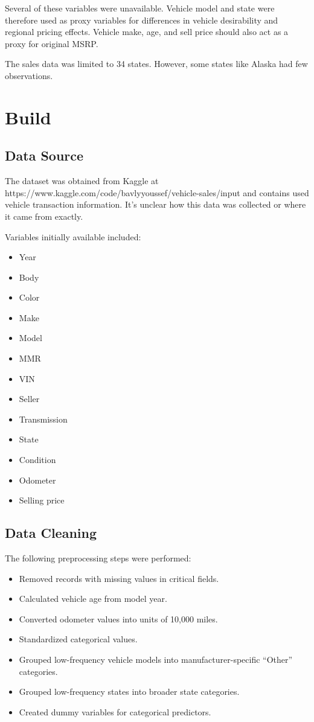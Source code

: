 \documentclass[
  12pt]{article}
\providecommand{\tightlist}{%
  \setlength{\itemsep}{0pt}\setlength{\parskip}{0pt}}
\begin{document}
Several of these variables were unavailable. Vehicle model and state
were therefore used as proxy variables for differences in vehicle
desirability and regional pricing effects. Vehicle make, age, and sell
price should also act as a proxy for original MSRP.

The sales data was limited to 34 states. However, some states like
Alaska had few observations.

\section{Build}\label{sec-build}

\subsection{Data Source}\label{data-source}

The dataset was obtained from Kaggle at
https://www.kaggle.com/code/bavlyyoussef/vehicle-sales/input and
contains used vehicle transaction information. It's unclear how this
data was collected or where it came from exactly.

Variables initially available included:

\begin{itemize}
\tightlist
\item
  Year
\item
  Body
\item
  Color
\item
  Make
\item
  Model
\item
  MMR
\item
  VIN
\item
  Seller
\item
  Transmission
\item
  State
\item
  Condition
\item
  Odometer
\item
  Selling price
\end{itemize}

\subsection{Data Cleaning}\label{data-cleaning}

The following preprocessing steps were performed:

\begin{itemize}
\tightlist
\item
  Removed records with missing values in critical fields.
\item
  Calculated vehicle age from model year.
\item
  Converted odometer values into units of 10,000 miles.
\item
  Standardized categorical values.
\item
  Grouped low-frequency vehicle models into manufacturer-specific
  ``Other'' categories.
\item
  Grouped low-frequency states into broader state categories.
\item
  Created dummy variables for categorical predictors.
\end{itemize}
\end{document}
